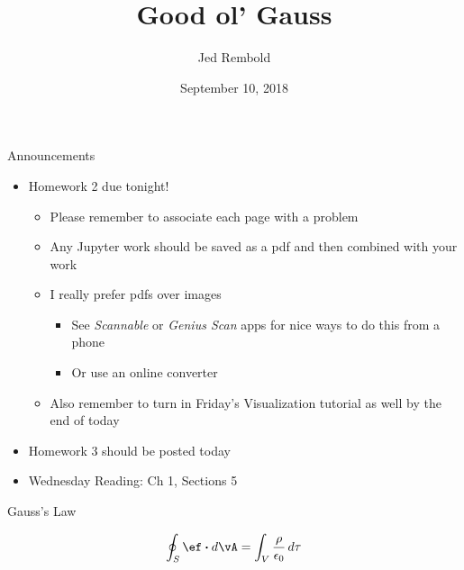 \documentclass[pdf,aspectratio=169]{beamer}
\title{Good ol' Gauss}
\date{September 10, 2018}
\author{Jed Rembold}
\begin{document}
\renewcommand{\theenumi}{\Alph{enumi}}

\begin{frame}{Announcements}
	\begin{itemize}
		\item Homework 2 due tonight!
			\begin{itemize}
				\item Please remember to associate each page with a problem
				\item Any Jupyter work should be saved as a pdf and then combined with your work
				\item I really prefer pdfs over images
					\begin{itemize}
						\item See \emph{Scannable} or \emph{Genius Scan} apps for nice ways to do this from a phone
						\item Or use an online converter
					\end{itemize}
				\item Also remember to turn in Friday's Visualization tutorial as well by the end of today
			\end{itemize}
		\item Homework 3 should be posted today
		\item Wednesday Reading: Ch 1, Sections 5
	\end{itemize}
\end{frame}

\begin{frame}{Gauss's Law}
	\begin{center}
	\end{center}
	\[\oint_S \ef \vdot d\vA = \int_V \frac{\rho}{\epsilon_0}\,d\tau\]
\end{frame}
\end{document}

